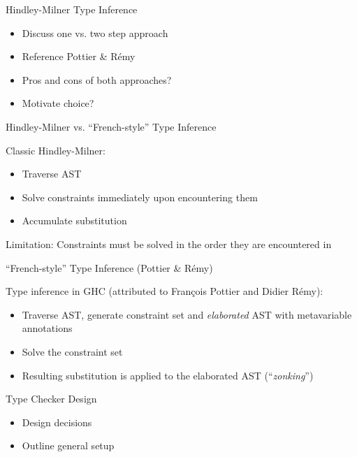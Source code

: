 \documentclass[dvipsnames,aspectratio=169]{beamer}
\begin{document}
\begin{frame}{Hindley-Milner Type Inference}

  \begin{itemize}
    \item Discuss one vs. two step approach
    \item Reference Pottier \& Rémy
    \item Pros and cons of both approaches?
    \item Motivate choice?
  \end{itemize}

\end{frame}


\begin{frame}{Hindley-Milner vs. ``French-style'' Type Inference}

  Classic Hindley-Milner:
  \begin{itemize}
    \item Traverse AST
    \item Solve constraints immediately upon encountering them
    \item Accumulate substitution
  \end{itemize}

  Limitation: Constraints must be solved in the order they are encountered in

\end{frame}


\begin{frame}{``French-style'' Type Inference (Pottier \& Rémy)}

  Type inference in GHC (attributed to François Pottier and Didier Rémy):
  \begin{itemize}
    \item Traverse AST, generate constraint set and \emph{elaborated} AST with
          metavariable annotations
    \item Solve the constraint set
    \item Resulting substitution is applied to the elaborated AST (``\emph{zonking}'')
  \end{itemize}

\end{frame}


\begin{frame}{Type Checker Design}

  \begin{itemize}
    \item Design decisions
    \item Outline general setup
  \end{itemize}

\end{frame}
\end{document}
